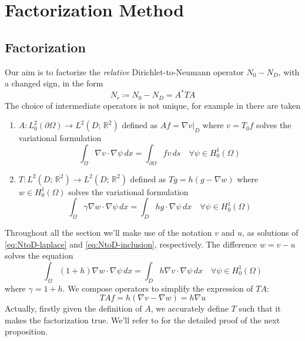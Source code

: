\documentclass[10pt, a4paper, twoside, openright]{book}
\theoremstyle{definition}
\theoremstyle{plain}
\theoremstyle{plain}
\theoremstyle{plain}
\theoremstyle{plain}
\theoremstyle{plain}
\theoremstyle{plain}
\theoremstyle{plain}
\theoremstyle{plain}
\begin{document}
\chapter{Factorization Method}
\label{ch:factorization}
\section{Factorization}
Our aim is to factorize the \textit{relative} Dirichlet-to-Neumann operator ${N_0} - {N_D}$, with a changed sign, in the form
\begin{equation}
 {N_r}\coloneqq{N_0} - {N_D} = A^*TA
\end{equation}
The choice of intermediate operators is not unique, for example in \cite{kirsch:book} there are taken
\begin{enumerate}
 \item $A:L^2_0(\partial \Omega) \to L^2(D;\,\mathbb{R}^2)$ defined as $Af = \nabla v|_D$ where $v = T_0f$ solves the variational formulation
 \begin{equation}
  \label{eq:def-A}
  \int_\Omega \nabla v\cdot \nabla \psi \, dx = \int_{\partial \Omega} fv\, ds\quad \forall\psi\in H^1_0(\Omega)
 \end{equation}
 \item $T:L^2(D;\,\mathbb{R}^2) \to L^2(D;\,\mathbb{R}^2)$ defined as $Tg = h(g - \nabla w)$ where $w\in H^1_0(\Omega)$ solves the variational formulation
 \begin{equation}
  \label{eq:def-T}
  \int_\Omega \gamma \nabla w\cdot \nabla \psi \, dx = \int_D hg\cdot\nabla\psi\, dx\quad \forall\psi\in H^1_0(\Omega)
 \end{equation}
\end{enumerate}
Throughout all the section we'll make use of the notation $v$ and $u$, as solutions of \eqref{eq:NtoD-laplace} and \eqref{eq:NtoD-inclusion}, respectively.
The difference $w = v - u$ solves the equation
\begin{equation}
 \int_\Omega(1+h)\nabla w\cdot\nabla\psi\, dx = \int_D h\nabla v \cdot \nabla \psi\, dx\quad \forall\psi\in H^1_0(\Omega)
\end{equation}
where $\gamma = 1 + h$.
We compose operators to simplify the expression of $TA$:
\begin{equation}
 TAf = h (\nabla v - \nabla w) = h \nabla u
\end{equation}
Actually, firstly given the definition of $A$, we accurately define $T$ such that it makes the factorization true.
We'll refer to \cite{kirsch:book} for the detailed proof of the next proposition.
\end{document}
